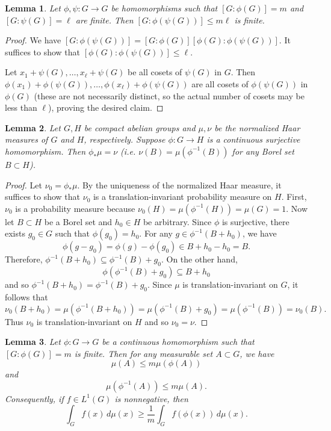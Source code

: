 \documentclass[10pt]{article}
\newtheorem{lemma}[lemma]{Lemma}
\theoremstyle{definition}
\begin{document}
\begin{lemma} \label{lem:composition}
Let $\phi, \psi: G \rightarrow G$ be  homomorphisms such that $[G:\phi(G)] = m$ and $[G:\psi(G)] = \ell$ are finite. Then
$[G: \phi ( \psi (G))] \leq m\ell$ is finite.
\end{lemma}
\begin{proof}
We have $[G:\phi(\psi(G))] = [G:\phi(G)] [\phi(G): \phi(\psi(G))]$. It suffices to show that $[\phi(G): \phi(\psi(G))] \leq \ell$. 

Let $x_1 + \psi(G), \ldots, x_\ell + \psi(G)$ be all cosets of $\psi(G)$ in $G$. Then $\phi(x_1) + \phi(\psi(G)), \ldots, \phi(x_\ell) + \phi(\psi(G))$ are all cosets of $\phi(\psi(G))$ in $\phi(G)$ (these are not necessarily distinct, so the actual number of cosets may be less than $\ell$), proving the desired claim. 
\end{proof}

\begin{lemma}
\label{lem:pushforward}
    Let $G, H$ be compact abelian groups and $\mu, \nu$ be the normalized Haar measures of $G$ and $H$, respectively. Suppose $\phi: G \to H$ is a continuous surjective homomorphism. Then $\phi_* \mu = \nu$ (i.e. $\nu(B) = \mu( \phi^{-1}(B))$ for any Borel set $B \subset H$).
\end{lemma}
\begin{proof}
    Let $\nu_0 = \phi_* \mu$. By the uniqueness of the normalized Haar measure, it suffices to show that $\nu_0$ is a translation-invariant probability measure on $H$. First, $\nu_0$ is a probability measure because $\nu_0(H) = \mu(\phi^{-1}(H)) = \mu(G) = 1$. Now let $B \subset H$ be a Borel set and $h_0 \in H$ be arbitrary. Since $\phi$ is surjective, there exists $g_0 \in G$ such that $\phi(g_0) = h_0$. For any $g \in \phi^{-1}(B + h_0)$, we have
    \[
        \phi(g - g_0) = \phi(g) - \phi(g_0) \in B + h_0 - h_0 = B.
    \]
    Therefore, $\phi^{-1}(B + h_0) \subseteq \phi^{-1}(B) + g_0.$ On the other hand, 
    \[
        \phi(\phi^{-1}(B) + g_0) \subseteq B + h_0
    \]
    and so $\phi^{-1}(B + h_0) = \phi^{-1}(B) + g_0$. Since $\mu$ is translation-invariant on $G$, it follows that
    \[
        \nu_0(B + h_0) = \mu(\phi^{-1}(B + h_0)) = \mu(\phi^{-1}(B) + g_0) = \mu(\phi^{-1}(B)) = \nu_0(B).
    \]
    Thus $\nu_0$ is translation-invariant on $H$ and so $\nu_0 = \nu$. 
\end{proof}


\begin{lemma} \label{lem:finite-index}
Let $\phi:G \rightarrow G$ be a continuous homomorphism such that $[G:\phi(G)]=m$ is finite. Then for any measurable set $A \subset G$, we have 
\begin{equation}
\mu( A ) \leq m \mu( \phi(A) )
\end{equation}
and
\begin{equation}
\mu( \phi^{-1}(A) ) \leq m \mu( A ).
\end{equation}
Consequently, if $f \in L^1(G)$ is nonnegative, then
\[
\int_G f(x) \, d\mu(x) \geq \frac{1}{m} \int_G f( \phi(x) ) \, d\mu(x).
\]
\end{lemma}
\end{document}
